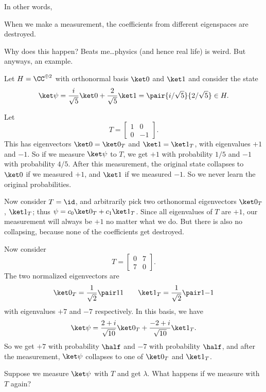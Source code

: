 In other words,
\begin{moral}
	When we make a measurement,
	the coefficients from different eigenspaces are destroyed.
\end{moral}
Why does this happen? Beats me\dots physics (and hence real life) is weird.
But anyways, an example.
\begin{example}
	Let $H = \CC^{\oplus 2}$ with orthonormal basis $\ket0$ and $\ket1$
	and consider the state
	\[
		\ket\psi
		= \frac{i}{\sqrt5} \ket 0
		+ \frac{2}{\sqrt5} \ket 1
		= \pair{i/\sqrt5}{2/\sqrt5} \in H.
	\]
	\begin{enumerate}[(a)]
		\ii Let \[ T = \begin{bmatrix} 1 & 0 \\ 0 & -1 \end{bmatrix}. \]
		This has eigenvectors $\ket0 = \ket0_T$ and $\ket1 = \ket1_T$,
		with eigenvalues $+1$ and $-1$.  So if we measure $\ket\psi$ to $T$,
		we get $+1$ with probability $1/5$ and $-1$ with probability $4/5$.
		After this measurement, the original state collapses to
		$\ket0$ if we measured $+1$, and $\ket1$ if we measured $-1$.
		So we never learn the original probabilities.

		\ii Now consider $T = \id$, and arbitrarily
		pick two orthonormal eigenvectors $\ket0_T$, $\ket1_T$;
		thus $\psi = c_0\ket0_T + c_1\ket1_T$.
		Since all eigenvalues of $T$ are $+1$,
		our measurement will always be $+1$ no matter what we do.
		But there is also no collapsing,
		because none of the coefficients get destroyed.

		\ii Now consider
		\[ T = \begin{bmatrix} 0 & 7 \\ 7 & 0 \end{bmatrix}. \]
		The two normalized eigenvectors are
		\[ \ket0_T = \frac{1}{\sqrt2}\pair11
		\qquad \ket1_T = \frac{1}{\sqrt2}\pair1{-1} \]
		with eigenvalues $+7$ and $-7$ respectively. In this basis, we have
		\[
			\ket\psi = \frac{2+i}{\sqrt{10}}\ket0_T
			+ \frac{-2+i}{\sqrt{10}}\ket1_T. \]
		So we get $+7$ with probability $\half$ and $-7$
		with probability $\half$, and after the measurement,
		$\ket\psi$ collapses to one of $\ket0_T$ and $\ket1_T$.
	\end{enumerate}
\end{example}
\begin{ques}
	Suppose we measure $\ket\psi$ with $T$ and get $\lambda$.
	What happens if we measure with $T$ again?
\end{ques}

